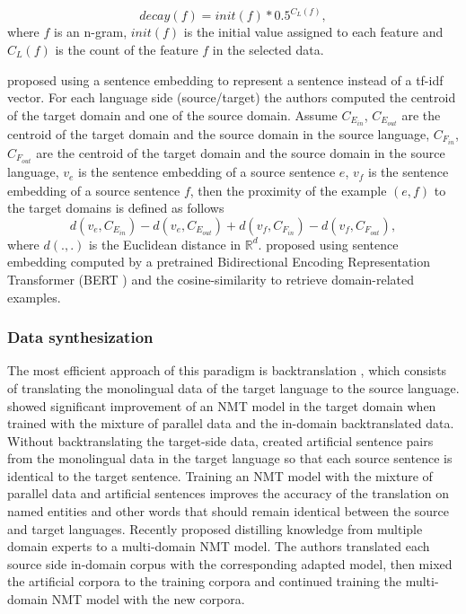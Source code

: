 \begin{equation}
decay(f) = init(f) * 0.5 ^{C_{L}(f)},
\end{equation}
where $f$ is an n-gram, $init(f)$ is the initial value assigned to each feature and $C_{L}(f)$ is the count of the feature $f$ in the selected data.

\citet{Wang17sentence} proposed using a sentence embedding to represent a sentence instead of a tf-idf vector. For each language side (source/target) the authors computed the centroid of the target domain and one of the source domain. Assume $C_{E_{in}}$, $C_{E_{out}}$ are the centroid of the target domain and the source domain in the source language,  $C_{F_{in}}$, $C_{F_{out}}$ are the centroid of the target domain and the source domain in the source language, $v_{\mathit{e}}$ is the sentence embedding of a source sentence $\mathit{e}$, $v_{\mathit{f}}$ is the sentence embedding of a source sentence $\mathit{f}$, then the proximity of the example $(\mathit{e},\mathit{f})$ to the target domains is defined as follows
\begin{equation}
d(v_{\mathit{e}}, C_{E_{in}}) - d(v_{\mathit{e}}, C_{E_{out}}) + d(v_{\mathit{f}}, C_{F_{in}}) - d(v_{\mathit{f}}, C_{F_{out}}),
\end{equation} 
where $d(.,.)$ is the Euclidean distance in $\mathbb{R}^d$. \citet{Aharoni20unsupervised} proposed using sentence embedding computed by a pretrained Bidirectional Encoding Representation Transformer (BERT ) and the cosine-similarity to retrieve domain-related examples.

\subsubsection{Data synthesization}
The most efficient approach of this paradigm is backtranslation \citep{Sennrich16improving}, which consists of translating the monolingual data of the target language to the source language. \citet{Burlot18using} showed significant improvement of an NMT model in the target domain when trained with the mixture of parallel data and the in-domain backtranslated data. Without backtranslating the target-side data, \citet{Currey17copied} created artificial sentence pairs from the monolingual data in the target language so that each source sentence is identical to the target sentence. Training an NMT model with the mixture of parallel data and artificial sentences improves the accuracy of the translation on named entities and other words that should remain identical between the source and target languages. Recently \citet{currey20distilling} proposed distilling knowledge from multiple domain experts to a multi-domain NMT model. The authors translated each source side in-domain corpus with the corresponding adapted model, then mixed the artificial corpora to the training corpora and continued training the multi-domain NMT model with the new corpora.

